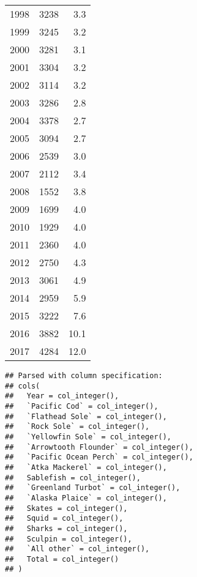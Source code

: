 \documentclass[]{article}
\begin{document}
\begin{table}[ht]
{\begin{tabular}{rrr}
  1998 & 3238 & 3.3 \\ 
  1999 & 3245 & 3.2 \\ 
  2000 & 3281 & 3.1 \\ 
  2001 & 3304 & 3.2 \\ 
  2002 & 3114 & 3.2 \\ 
  2003 & 3286 & 2.8 \\ 
  2004 & 3378 & 2.7 \\ 
  2005 & 3094 & 2.7 \\ 
  2006 & 2539 & 3.0 \\ 
  2007 & 2112 & 3.4 \\ 
  2008 & 1552 & 3.8 \\ 
  2009 & 1699 & 4.0 \\ 
  2010 & 1929 & 4.0 \\ 
  2011 & 2360 & 4.0 \\ 
  2012 & 2750 & 4.3 \\ 
  2013 & 3061 & 4.9 \\ 
  2014 & 2959 & 5.9 \\ 
  2015 & 3222 & 7.6 \\ 
  2016 & 3882 & 10.1 \\ 
  2017 & 4284 & 12.0 \\ 
   \hline
\end{tabular}
}
\end{table}

\begin{verbatim}
## Parsed with column specification:
## cols(
##   Year = col_integer(),
##   `Pacific Cod` = col_integer(),
##   `Flathead Sole` = col_integer(),
##   `Rock Sole` = col_integer(),
##   `Yellowfin Sole` = col_integer(),
##   `Arrowtooth Flounder` = col_integer(),
##   `Pacific Ocean Perch` = col_integer(),
##   `Atka Mackerel` = col_integer(),
##   Sablefish = col_integer(),
##   `Greenland Turbot` = col_integer(),
##   `Alaska Plaice` = col_integer(),
##   Skates = col_integer(),
##   Squid = col_integer(),
##   Sharks = col_integer(),
##   Sculpin = col_integer(),
##   `All other` = col_integer(),
##   Total = col_integer()
## )
\end{verbatim}
\end{document}
